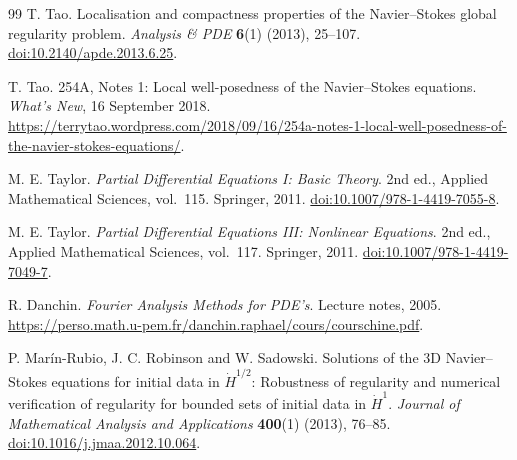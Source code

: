\begin{thebibliography}{99}
T. Tao. Localisation and compactness properties of the Navier--Stokes global regularity problem. \emph{Analysis \& PDE} \textbf{6}(1) (2013), 25--107. \href{https://doi.org/10.2140/apde.2013.6.25}{doi:10.2140/apde.2013.6.25}.

T. Tao. 254A, Notes 1: Local well-posedness of the Navier--Stokes equations. \emph{What's New}, 16 September 2018. \url{https://terrytao.wordpress.com/2018/09/16/254a-notes-1-local-well-posedness-of-the-navier-stokes-equations/}.

M. E. Taylor. \emph{Partial Differential Equations I: Basic Theory}. 2nd ed., Applied Mathematical Sciences, vol.~115. Springer, 2011. \href{https://doi.org/10.1007/978-1-4419-7055-8}{doi:10.1007/978-1-4419-7055-8}.

M. E. Taylor. \emph{Partial Differential Equations III: Nonlinear Equations}. 2nd ed., Applied Mathematical Sciences, vol.~117. Springer, 2011. \href{https://doi.org/10.1007/978-1-4419-7049-7}{doi:10.1007/978-1-4419-7049-7}.

R. Danchin. \emph{Fourier Analysis Methods for PDE's}. Lecture notes, 2005. \url{https://perso.math.u-pem.fr/danchin.raphael/cours/courschine.pdf}.

P. Mar\'in-Rubio, J. C. Robinson and W. Sadowski. Solutions of the 3D Navier--Stokes equations for initial data in $\dot H^{1/2}$: Robustness of regularity and numerical verification of regularity for bounded sets of initial data in $\dot H^1$. \emph{Journal of Mathematical Analysis and Applications} \textbf{400}(1) (2013), 76--85. \href{https://doi.org/10.1016/j.jmaa.2012.10.064}{doi:10.1016/j.jmaa.2012.10.064}.
\end{thebibliography}
